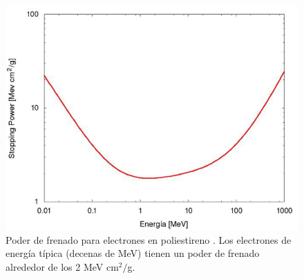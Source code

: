 \documentclass[12pt,oneside,openany,letter]{book}
\begin{document}
\begin{figure}[h!]
    \centering        \includegraphics[scale=0.6]{images/stopping_e_scint.png}
\caption[Poder de frenado para electrones en poliestireno]{Poder de frenado para electrones en poliestireno \cite{Gonzalez-maestrando2012}. Los electrones de energ\'ia t\'ipica (decenas de MeV) tienen un poder de frenado alrededor de los 2 MeV cm$^2/$g.}\label{stopping_e_scint}
\end{figure}
\end{document}
